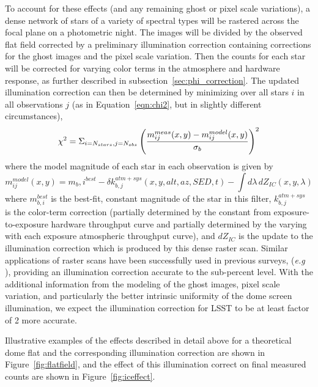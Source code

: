 \documentclass[12pt,preprint]{aastex}
\begin{document}
To account for these effects (and any remaining ghost or pixel scale
variations), a dense network of stars of a variety of spectral types
will be rastered across the focal plane on a photometric night. The
images will be divided by the observed flat field corrected by a
preliminary illumination correction containing corrections for the
ghost images and the pixel scale variation. Then the counts for
each star will be corrected for varying color terms in the atmosphere
and hardware response, as further described in
subsection~\ref{sec:phi_correction}.  The updated illumination
correction can then be determined by minimizing over all
stars $i$ in all observations $j$ (as in Equation~\ref{eqn:chi2}, but
in slightly different circumstances),
\begin{equation}
 \chi^2 =  \Sigma_{i=N_{stars},j=N_{obs}} \left( { m_{ij}^{meas}(x,y) - m_{ij}^{model}(x,y)
\over \sigma_b} \right)^2  
\end{equation}
where the model magnitude of each star in each observation is given by
\begin{equation}
m_{ij}^{model}(x,y) =  m_b,i^{best} - \delta k_{b,j}^{atm+sys}(x,y,alt,az,SED,t) - \int d\lambda \, dZ_{IC}(x,y,\lambda)
\end{equation}
where $m_{b,i}^{best}$ is the best-fit, constant magnitude of the star
in this filter, $k_{b,j}^{atm+sys}$ is the color-term correction
(partially determined by the constant from exposure-to-exposure
hardware throughput curve and partially determined by the varying with
each exposure atmospheric throughput curve), and $dZ_{IC}$ is the
update to the illumination correction which is produced by this dense
raster scan. Similar applications of raster scans have been
successfully used in previous surveys, ({\it e.g} \citet{Regnault2009,
Magnier2004, Manfroid1996}), providing an illumination correction
accurate to the sub-percent level.  With the additional information
from the modeling of the ghost images, pixel scale variation, and
particularly the better intrinsic uniformity of the dome screen
illumination, we expect the illumination correction for LSST to be at
least factor of 2 more accurate.


Illustrative examples of the effects described in detail above for a
theoretical dome flat and the corresponding illumination correction
are shown in Figure~\ref{fig:flatfield}, and the effect of this
illumination correct on final measured counts are shown in
Figure~\ref{fig:iceffect}.
\end{document}
